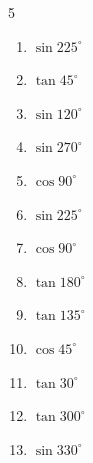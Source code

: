 \begin{multicols}{5}
\begin{enumerate}
  \item $\displaystyle \sin{225^\circ}$


  \item $\displaystyle \tan{45^\circ}$

        \phantom{$\displaystyle =1$}

  \item $\displaystyle \sin{120^\circ}$


  \item $\displaystyle \sin{270^\circ}$

        \phantom{$\displaystyle =-1$}

  \item $\displaystyle \cos{90^\circ}$

        \phantom{$\displaystyle =0$}

  \item $\displaystyle \sin{225^\circ}$


  \item $\displaystyle \cos{90^\circ}$

        \phantom{$\displaystyle =0$}

  \item $\displaystyle \tan{180^\circ}$

        \phantom{$\displaystyle =0$}

  \item $\displaystyle \tan{135^\circ}$

        \phantom{$\displaystyle =-1$}

  \item $\displaystyle \cos{45^\circ}$


\columnbreak %

  \item $\displaystyle \tan{30^\circ}$


  \item $\displaystyle \tan{300^\circ}$


  \item $\displaystyle \sin{330^\circ}$


\end{enumerate}
\end{multicols}
